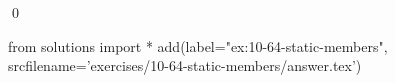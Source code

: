 
\begin{ex}
  \label{ex:10-64-static-members}
  
  \qed
\end{ex}
\begin{python0}
from solutions import *
add(label="ex:10-64-static-members",
    srcfilename='exercises/10-64-static-members/answer.tex')
\end{python0}
